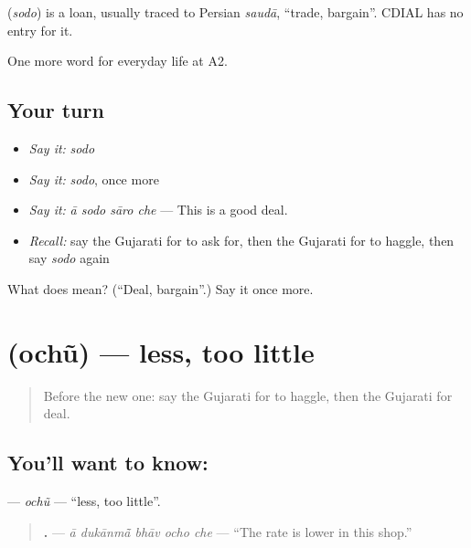 \begin{cousinweb}
\textbf{} (\emph{sodo}) is a loan, usually traced to Persian \emph{saudā}, \textquotedblleft{}trade, bargain\textquotedblright{}. CDIAL has no entry for it.
\end{cousinweb}

\begin{grammarlens}[title={What you've built}]
One more word for everyday life at A2.
\end{grammarlens}

\subsection*{Your turn}
\begin{itemize}
\raggedright
  \item \emph{Say it:} \emph{sodo}
  \item \emph{Say it:} \emph{sodo}, once more
  \item \emph{Say it:} \emph{ā sodo sāro che} — This is a good deal.
  \item \emph{Recall:} say the Gujarati for to ask for, then the Gujarati for to haggle, then say \emph{sodo} again
\end{itemize}

\begin{tcolorbox}[breakable,colback=teal!4,colframe=teal!35!black,title={Before you move on}]
What does  mean? (\textquotedblleft{}Deal, bargain\textquotedblright{}.) Say it once more.
\end{tcolorbox}
\section[\texorpdfstring{\gu{ઓછું} (ochũ)}{ઓછું (ochũ)}]{ (ochũ) — less, too little}

\label{lesson:GU-C185-ochu}



\begin{quote}
Before the new one: say the Gujarati for to haggle, then the Gujarati for deal.
\end{quote}

\subsection*{You'll want to know: }
\textbf{} — \emph{ochũ} — \textquotedblleft{}less, too little\textquotedblright{}.

\begin{quote}
\textbf{    .} — \emph{ā dukānmā̃ bhāv ocho che} — \textquotedblleft{}The rate is lower in this shop.\textquotedblright{}
\end{quote}

